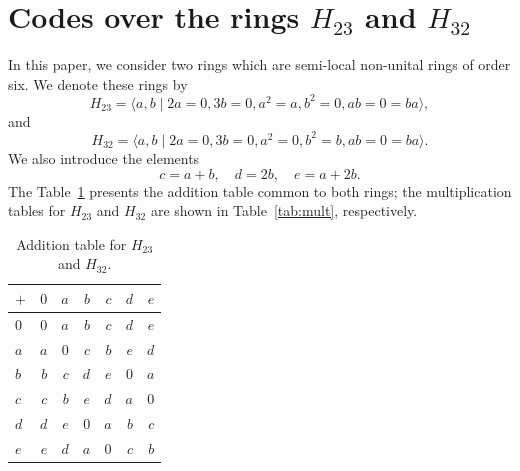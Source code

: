 \documentclass[11pt,a4paper]{article}
\theoremstyle{definition}
\numberwithin{equation}{section}
\begin{document}

\section{Codes over the rings $H_{23}$ and $H_{32}$}\label{sec:rings}

In this paper, we consider two rings which are semi-local non-unital rings of order six. We denote these rings by {\small \[ H_{23} = \langle a,b \mid 2a=0, 3b = 0, a^2=a, b^2 = 0, ab = 0 = ba \rangle,\]}
and
{\small \[H_{32} = \langle a,b \mid 2a=0, 3b = 0, a^2=0, b^2 = b, ab = 0 = ba \rangle. \]}
We also introduce the elements
\[
c = a + b,\quad
d = 2b,\quad
e = a + 2b.
\]
The Table~\ref{tab:add} presents the addition table common to both rings; the multiplication tables for \(H_{23}\) and \(H_{32}\) are shown in Table~\ref{tab:mult}, respectively.  
\begin{table}[h]
\centering
\begin{tabular}{lrrrrrr}
\toprule
$+$ & $0$ & $a$ & $b$ & $c$ & $d$ & $e$ \\
\midrule
$0$ & $0$ & $a$ & $b$ & $c$ & $d$ & $e$ \\
$a$ & $a$ & $0$ & $c$ & $b$ & $e$ & $d$ \\ 
$b$ & $b$ & $c$ & $d$ & $e$ & $0$ & $a$ \\
$c$ & $c$ & $b$ & $e$ & $d$ & $a$ & $0$ \\
$d$ & $d$ & $e$ & $0$ & $a$ & $b$ & $c$ \\
$e$ & $e$ & $d$ & $a$ & $0$ & $c$ & $b$ \\
\bottomrule
\end{tabular}
\caption{Addition table for $H_{23}$ and $H_{32}$.}
\label{tab:add}
\end{table}
\end{document}
